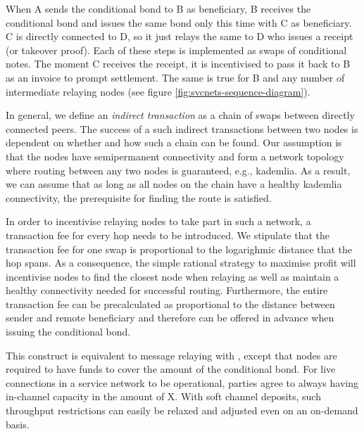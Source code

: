 When A sends the conditional bond to B as beneficiary, B receives the conditional bond
and issues the same bond
only this time with C as beneficiary. C is directly connected to D, so
it just relays the same to D who issues a receipt (or takeover proof).
Each of these steps is implemented as swaps of conditional notes. The moment C receives
the receipt, it is incentivised to pass it back to B as an invoice to prompt
settlement. The same is true for B and any number of intermediate relaying nodes
(see figure \ref{fig:svcnets-sequence-diagram}).




In general, we define an \emph{indirect transaction} as a chain of swaps between directly connected
peers. The success of a such indirect transactions between two nodes is dependent on whether and
how such a chain can be found. Our assumption is that the nodes have semipermanent connectivity
and form a network topology where routing between any two nodes is guaranteed, e.g., kademlia. As a result, we can assume that as long as all nodes on the chain have a healthy kademlia connectivity, the prerequisite for finding the route is satisfied.

In order to incentivise relaying nodes to take part in such a network,
a transaction fee for every hop needs to be introduced.  We stipulate that the transaction fee
for one swap is proportional to the logarighmic distance that the hop spans.
As a consequence, the simple rational strategy to maximise profit will incentivise nodes to find the
closest node when relaying as well as maintain a healthy connectivity needed for successful routing.
Furthermore, the entire transaction fee can be precalculated as proportional
to the distance between sender and remote beneficiary and therefore can be offered in advance
when issuing the conditional bond.

This construct is
equivalent to message relaying with , except that nodes are required to have
funds to cover the amount of the conditional bond.
For live connections in a service network to be operational,
parties agree to always having in-channel capacity in the amount of X.
With soft channel deposits, such throughput restrictions can easily
be relaxed and adjusted even on an on-demand basis.


